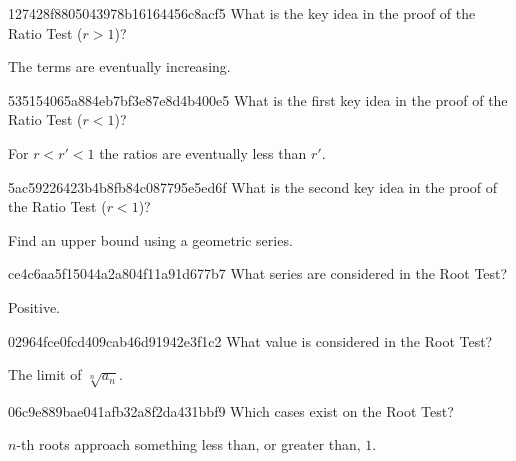 \begin{note}{127428f8805043978b16164456c8acf5}
    What is the key idea in the proof of the Ratio Test (\({ r > 1 }\))?

    \begin{cloze}{1}
        The terms are eventually increasing.
    \end{cloze}
\end{note}

\begin{note}{535154065a884eb7bf3e87e8d4b400e5}
    What is the first key idea in the proof of the Ratio Test (\({ r < 1 }\))?

    \begin{cloze}{1}
        For \({ r < r' < 1 }\) the ratios are eventually less than \({ r' }\).
    \end{cloze}
\end{note}

\begin{note}{5ac59226423b4b8fb84c087795e5ed6f}
    What is the second key idea in the proof of the Ratio Test (\({ r < 1 }\))?

    \begin{cloze}{1}
        Find an upper bound using a geometric series.
    \end{cloze}
\end{note}

\begin{note}{ce4c6aa5f15044a2a804f11a91d677b7}
    What series are considered in the Root Test?

    \begin{cloze}{1}
        Positive.
    \end{cloze}
\end{note}

\begin{note}{02964fce0fcd409cab46d91942e3f1c2}
    What value is considered in the Root Test?

    \begin{cloze}{1}
        The limit of \({ \sqrt[n]{a_n} }\).
    \end{cloze}
\end{note}

\begin{note}{06c9e889bae041afb32a8f2da431bbf9}
    Which cases exist on the Root Test?

    \begin{cloze}{1}
        \({ n }\)-th roots approach something less than, or greater than, \({ 1 }\).
    \end{cloze}
\end{note}

